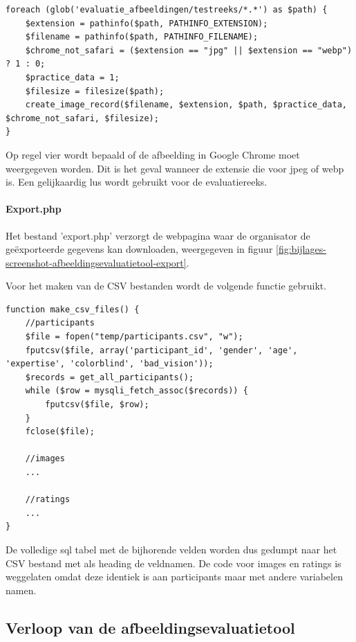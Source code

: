\begin{lstlisting}
foreach (glob('evaluatie_afbeeldingen/testreeks/*.*') as $path) {
	$extension = pathinfo($path, PATHINFO_EXTENSION);
	$filename = pathinfo($path, PATHINFO_FILENAME);
	$chrome_not_safari = ($extension == "jpg" || $extension == "webp") ? 1 : 0;
	$practice_data = 1;
	$filesize = filesize($path);
	create_image_record($filename, $extension, $path, $practice_data, $chrome_not_safari, $filesize);
}
\end{lstlisting}

Op regel vier wordt bepaald of de afbeelding in Google Chrome moet weergegeven worden. Dit is het geval wanneer de \gls{extensie} die voor \gls{jpeg} of \gls{webp} is. Een gelijkaardig lus wordt gebruikt voor de evaluatiereeks. 

\paragraph{Export.php}
\label{sec:onderzoek-evaluatietool-setup-export}

Het bestand 'export.php' verzorgt de webpagina waar de organisator de geëxporteerde gegevens kan downloaden, weergegeven in figuur \ref{fig:bijlages-screenshot-afbeeldingsevaluatietool-export}.  

Voor het maken van de CSV bestanden wordt de volgende functie gebruikt.

\begin{lstlisting}
function make_csv_files() {
	//participants
	$file = fopen("temp/participants.csv", "w");
	fputcsv($file, array('participant_id', 'gender', 'age', 'expertise', 'colorblind', 'bad_vision'));
	$records = get_all_participants();
	while ($row = mysqli_fetch_assoc($records)) {
		fputcsv($file, $row);
	}
	fclose($file);
	
	//images
	...
	
	//ratings
	...
}
\end{lstlisting}

De volledige \gls{sql} tabel met de bijhorende velden worden dus gedumpt naar het CSV bestand met als heading de veldnamen. De code voor images en ratings is weggelaten omdat deze identiek is aan participants maar met andere variabelen namen.

\subsection{Verloop  van de afbeeldingsevaluatietool}
\label{sec:onderzoek-evaluatietool-verloop}

